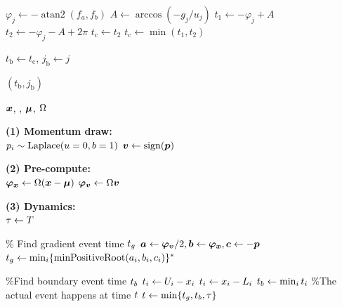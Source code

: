 \begin{minipage}[t]{0.49\textwidth}
\begin{algorithm}[H]
\begin{algorithmic}[1]
				\STATE $\varphi_j \gets -\operatorname{atan2}(f_a, f_b)$
				\STATE $A \gets \arccos(-g_j/u_j)$
				\STATE $t_1 \gets -\varphi_j + A$
				\STATE $t_2 \gets -\varphi_j - A + 2\pi$
				\STATE $ t_{\text{c}} \gets t_2 $
				\ELSE \STATE $t_{\text{c}} \gets \min(t_1, t_2)$
				\ENDIF
				\spacersmall

				\STATE $t_{\text{b}} \gets t_{\text{c}}$, $j_{\text{b}} \gets j$
				\ENDIF
				\ENDIF
				\ENDFOR
				\spacersmall

				\RETURN $(t_{\text{b}}, j_{\text{b}})$

			\end{algorithmic}
		\end{algorithm}
	\end{minipage}
	\hfill
	\begin{minipage}[t]{0.49\textwidth}
		\begin{algorithm}[H]
			\caption{\zhmc for MTNs}
			\label{alg:zhmc}
			\begin{algorithmic}[1]
				\REQUIRE $\bm{x}$, \integrationTime, $ \bm{\mu} $, $ \Omega $

				\textbf{(1) Momentum draw:} \\
				\STATE $ p_i \sim \operatorname{Laplace}(u=0, b=1)$ 
				\STATE $ \bm{v} \gets \operatorname{sign}(\bm{p}) $ 
				\spacersmall

				\textbf{(2) Pre-compute:} \\
				\STATE $\bm{\varphi}_{\bm{x}} \gets \Omega (\bm{x} - \bm{\mu})$ 
				\STATE $\bm{\varphi}_{\bm{v}} \gets \Omega \bm{v}$ 
				\spacersmall

				\textbf{(3) Dynamics:} \\
				\STATE $ \tau \gets T $ 
				\spacersmall

				\spacersmall
				\STATE \% Find gradient event time $ t_g $ 
				\STATE $ \bm{a} \gets  \bm{\varphi}_{\bm{v}} /2, \bm{b} \gets \bm{\varphi}_{\bm{x}}, \bm{c} \gets -\bm{p}$
				\STATE $ t_g \gets \min_i \{\text{minPositiveRoot}(a_i, b_i, c_i) \}^*$

				\spacersmall
				\STATE \%Find boundary event time $ t_b $ 
				\STATE $t_i \gets U_i - x_i$
				\ELSE
				\STATE $t_i \gets x_i - L_i$
				\ENDIF
				\ENDFOR
				\STATE	$ t_b \gets  \min_i t_i$
				\spacersmall
				\STATE \%The actual event happens at time $ t $ 
				\STATE $ t \gets \min \{ t_g, t_b, \tau\}  $
				\spacersmall


\end{algorithmic}
\end{algorithm}
\end{minipage}
